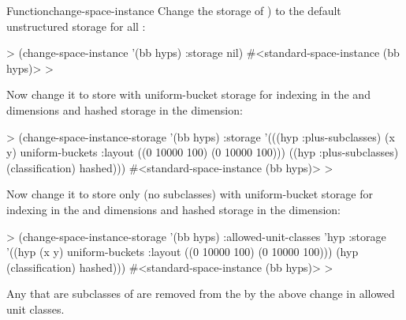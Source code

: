 \documentclass[10pt,twoside,english,pdftex]{article}
\begin{document}
\begin{functiondoc}{Function}{change-space-instance}{%
     
    \returns{} }
\fnexamples
%
Change the storage of  ) to the default
unstructured storage for all :
%
\W\supp
\begin{example}
  > (change-space-instance '(bb hyps) :storage nil)
  #<standard-space-instance (bb hyps)>
  >
\end{example}
%
Now change it to store   with uniform-bucket
storage for indexing in the  and  dimensions and hashed
storage in the  dimension:
%
\W\supp\notpretop
\begin{example}
  > (change-space-instance-storage '(bb hyps)
       :storage '(((hyp :plus-subclasses) (x y) 
                    uniform-buckets :layout ((0 10000 100)
                                             (0 10000 100)))
                  ((hyp :plus-subclasses) (classification) 
                    hashed)))
  #<standard-space-instance (bb hyps)>
  >
\end{example}
%
Now change it to store only   (no subclasses)
with uniform-bucket storage for indexing in the  and 
dimensions and hashed storage in the  dimension:
%
\W\supp\notpretop
\begin{example}
  > (change-space-instance-storage '(bb hyps)
       :allowed-unit-classes 'hyp     
       :storage '((hyp (x y) 
                   uniform-buckets :layout ((0 10000 100)
                                            (0 10000 100)))
                  (hyp (classification) hashed)))
  #<standard-space-instance (bb hyps)>
  > 
\end{example}
%
Any  that are subclasses of  are removed from
the   by the above change in allowed
unit classes.

\end{functiondoc}

\end{document}
